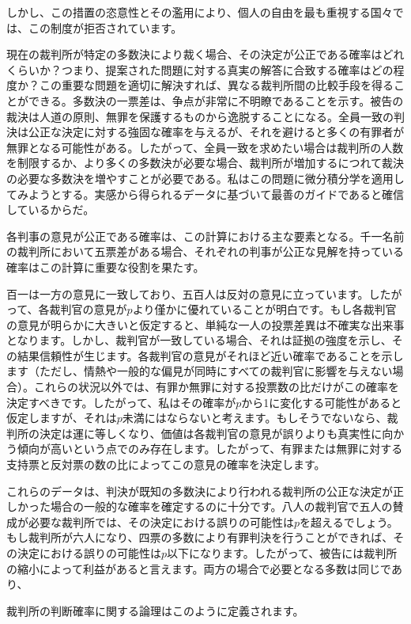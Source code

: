 \documentclass[a4paper,11pt,openany]{ltjsbook}
\begin{document}
しかし、この措置の恣意性とその濫用により、個人の自由を最も重視する国々では、この制度が拒否されています。

現在の裁判所が特定の多数決により裁く場合、その決定が公正である確率はどれくらいか？つまり、提案された問題に対する真実の解答に合致する確率はどの程度か？この重要な問題を適切に解決すれば、異なる裁判所間の比較手段を得ることができる。多数決の一票差は、争点が非常に不明瞭であることを示す。被告の裁決は人道の原則、無罪を保護するものから逸脱することになる。全員一致の判決は公正な決定に対する強固な確率を与えるが、それを避けると多くの有罪者が無罪となる可能性がある。したがって、全員一致を求めたい場合は裁判所の人数を制限するか、より多くの多数決が必要な場合、裁判所が増加するにつれて裁決の必要な多数決を増やすことが必要である。私はこの問題に微分積分学を適用してみようとする。実感から得られるデータに基づいて最善のガイドであると確信しているからだ。

各判事の意見が公正である確率は、この計算における主な要素となる。千一名前の裁判所において五票差がある場合、それぞれの判事が公正な見解を持っている確率はこの計算に重要な役割を果たす。

百一は一方の意見に一致しており、五百人は反対の意見に立っています。したがって、各裁判官の意見が$p$より僅かに優れていることが明白です。もし各裁判官の意見が明らかに大きいと仮定すると、単純な一人の投票差異は不確実な出来事となります。しかし、裁判官が一致している場合、それは証拠の強度を示し、その結果信頼性が生じます。各裁判官の意見がそれほど近い確率であることを示します（ただし、情熱や一般的な偏見が同時にすべての裁判官に影響を与えない場合）。これらの状況以外では、有罪か無罪に対する投票数の比だけがこの確率を決定すべきです。したがって、私はその確率が$p$から1に変化する可能性があると仮定しますが、それは$p$未満にはならないと考えます。もしそうでないなら、裁判所の決定は運に等しくなり、価値は各裁判官の意見が誤りよりも真実性に向かう傾向が高いという点でのみ存在します。したがって、有罪または無罪に対する支持票と反対票の数の比によってこの意見の確率を決定します。

これらのデータは、判決が既知の多数決により行われる裁判所の公正な決定が正しかった場合の一般的な確率を確定するのに十分です。八人の裁判官で五人の賛成が必要な裁判所では、その決定における誤りの可能性は$p$を超えるでしょう。もし裁判所が六人になり、四票の多数により有罪判決を行うことができれば、その決定における誤りの可能性は$p$以下になります。したがって、被告には裁判所の縮小によって利益があると言えます。両方の場合で必要となる多数は同じであり、

裁判所の判断確率に関する論理はこのように定義されます。
\end{document}
